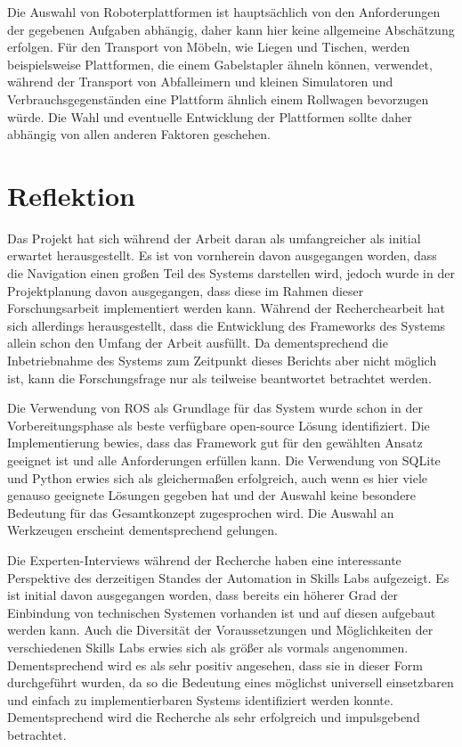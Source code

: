 Die Auswahl von Roboterplattformen ist hauptsächlich von den Anforderungen der gegebenen Aufgaben abhängig, daher kann hier keine allgemeine Abschätzung erfolgen. Für den Transport von Möbeln, wie Liegen und Tischen, werden beispielsweise Plattformen, die einem Gabelstapler ähneln können, verwendet, während der Transport von Abfalleimern und kleinen Simulatoren und Verbrauchsgegenständen eine Plattform ähnlich einem Rollwagen bevorzugen würde. Die Wahl und eventuelle Entwicklung der Plattformen sollte daher abhängig von allen anderen Faktoren geschehen.


\newpage \section{Reflektion}

Das Projekt hat sich während der Arbeit daran als umfangreicher als initial erwartet herausgestellt. Es ist von vornherein davon ausgegangen worden, dass die Navigation einen großen Teil des Systems darstellen wird, jedoch wurde in der Projektplanung davon ausgegangen, dass diese im Rahmen dieser Forschungsarbeit implementiert werden kann. Während der Recherchearbeit hat sich allerdings herausgestellt, dass die Entwicklung des Frameworks des Systems allein schon den Umfang der Arbeit ausfüllt. Da dementsprechend die Inbetriebnahme des Systems zum Zeitpunkt dieses Berichts aber nicht möglich ist, kann die Forschungsfrage nur als teilweise beantwortet betrachtet werden.

Die Verwendung von ROS als Grundlage für das System wurde schon in der Vorbereitungsphase als beste verfügbare open-source Lösung identifiziert. Die Implementierung bewies, dass das Framework gut für den gewählten Ansatz geeignet ist und alle Anforderungen erfüllen kann. Die Verwendung von SQLite und Python erwies sich als gleichermaßen erfolgreich, auch wenn es hier viele genauso geeignete Lösungen gegeben hat und der Auswahl keine besondere Bedeutung für das Gesamtkonzept zugesprochen wird. Die Auswahl an Werkzeugen erscheint dementsprechend gelungen.

Die Experten-Interviews während der Recherche haben eine interessante Perspektive des derzeitigen Standes der Automation in Skills Labs aufgezeigt. Es ist initial davon ausgegangen worden, dass bereits ein höherer Grad der Einbindung von technischen Systemen vorhanden ist und auf diesen aufgebaut werden kann. Auch die Diversität der Voraussetzungen und Möglichkeiten der verschiedenen Skills Labs erwies sich als größer als vormals angenommen. Dementsprechend wird es als sehr positiv angesehen, dass sie in dieser Form durchgeführt wurden, da so die Bedeutung eines möglichst universell einsetzbaren und einfach zu implementierbaren Systems identifiziert werden konnte. Dementsprechend wird die Recherche als sehr erfolgreich und impulsgebend betrachtet.

